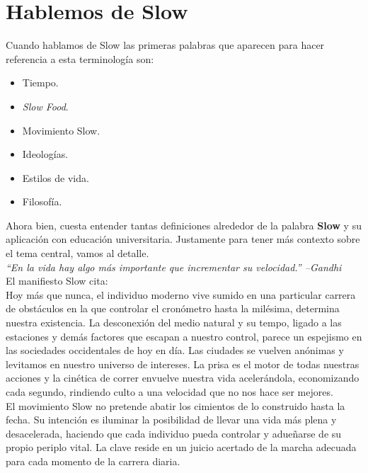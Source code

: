 \section{Hablemos de Slow}
Cuando hablamos de Slow las primeras palabras que aparecen para hacer referencia a esta terminolog\'ia son:
\begin{itemize}
 \item Tiempo.
 \item \textit{Slow Food}.
 \item Movimiento Slow.
 \item Ideolog\'ias.
 \item Estilos de vida.
 \item Filosof\'ia.
\end{itemize}
Ahora bien, cuesta entender tantas definiciones alrededor de la palabra \textbf{Slow} y su aplicaci\'on con educaci\'on universitaria. Justamente para tener m\'as
 contexto sobre el tema central, vamos al detalle. \\
\textit{``En la vida hay algo m\'as importante que incrementar su velocidad.'' --Gandhi}\\
El manifiesto Slow cita:\\
Hoy m\'as que nunca, el individuo moderno vive sumido en una particular carrera de obst\'aculos en la que controlar el cron\'ometro hasta la mil\'esima, determina
nuestra existencia. La desconexi\'on del medio natural y su tempo, ligado a las estaciones y dem\'as factores que escapan a nuestro control, parece un espejismo
en las sociedades occidentales de hoy en d\'ia. Las ciudades se vuelven an\'onimas y levitamos en nuestro universo de intereses. La prisa es el motor de todas 
nuestras acciones y la cin\'etica de correr envuelve nuestra vida aceler\'andola, economizando cada segundo, rindiendo culto a una velocidad que no nos hace ser 
mejores.\\
El movimiento Slow no pretende abatir los cimientos de lo construido hasta la fecha. Su intenci\'on es iluminar la posibilidad de llevar una vida m\'as plena y 
desacelerada, haciendo que cada individuo pueda controlar y adue\~narse de su propio periplo vital. La clave reside en un juicio acertado de la marcha adecuada 
para cada momento de la carrera diaria.



